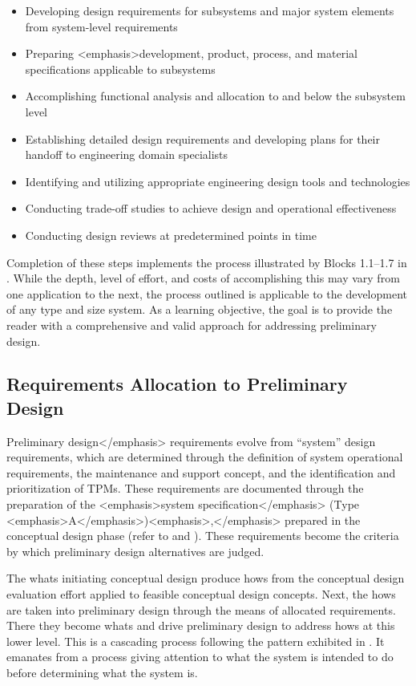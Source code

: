 \begin{itemize}
\item Developing design requirements for subsystems and major system elements from system-level requirements
\item Preparing <emphasis>development, product, process, and material specifications applicable to subsystems
\item Accomplishing functional analysis and allocation to and below the subsystem level
\item Establishing detailed design requirements and developing plans for their handoff to engineering domain specialists
\item Identifying and utilizing appropriate engineering design tools and technologies
\item Conducting trade-off studies to achieve design and operational effectiveness
\item Conducting design reviews at predetermined points in time
\end{itemize}

Completion of these steps implements the process illustrated by Blocks 1.1–1.7 in . While the depth, level of effort, and costs of accomplishing this may vary from one application to the next, the process outlined is applicable to the development of any type and size system. As a learning objective, the goal is to provide the reader with a comprehensive and valid approach for addressing preliminary design.

\subsection{Requirements Allocation to Preliminary Design}

Preliminary design</emphasis> requirements evolve from “system” design requirements, which are determined through the definition of system operational requirements, the maintenance and support concept, and the identification and prioritization of TPMs. These requirements are documented through the preparation of the <emphasis>system specification</emphasis> (Type <emphasis>A</emphasis>)<emphasis>,</emphasis> prepared in the conceptual design phase (refer to  and ). These requirements become the criteria by which preliminary design alternatives are judged.

The whats initiating conceptual design produce hows from the conceptual design evaluation effort applied to feasible conceptual design concepts. Next, the hows are taken into preliminary design through the means of allocated requirements. There they become whats and drive preliminary design to address hows at this lower level. This is a cascading process following the pattern exhibited in . It emanates from a process giving attention to what the system is intended to do before determining what the system is.

